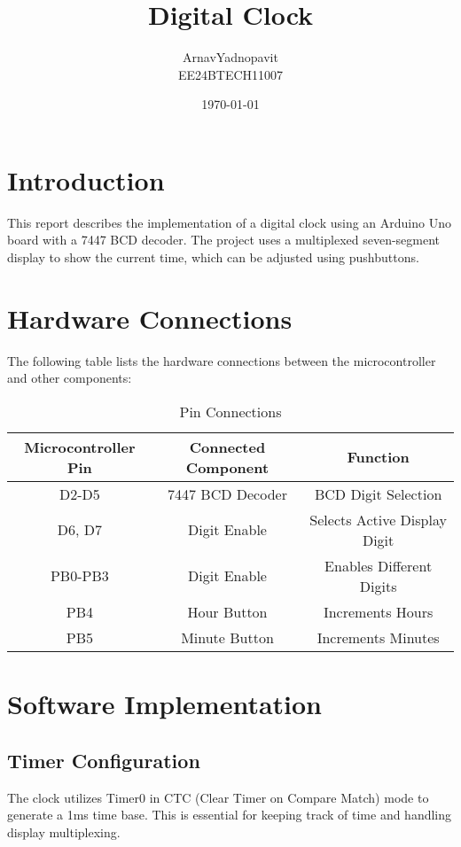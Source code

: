 \documentclass{article}
\title{Digital Clock}
\author{ArnavYadnopavit\\EE24BTECH11007}
\date{\today}
\begin{document}
\maketitle

\section{Introduction}
This report describes the implementation of a digital clock using an Arduino Uno board with a 7447 BCD decoder. The project uses a multiplexed seven-segment display to show the current time, which can be adjusted using pushbuttons.

\section{Hardware Connections}
The following table lists the hardware connections between the microcontroller and other components:

\begin{table}[h]
    \centering
    \begin{tabular}{|c|c|c|}
        \hline
        \textbf{Microcontroller Pin} & \textbf{Connected Component} & \textbf{Function} \\
        \hline
        D2-D5 & 7447 BCD Decoder & BCD Digit Selection \\
        D6, D7 & Digit Enable & Selects Active Display Digit \\
        PB0-PB3 & Digit Enable & Enables Different Digits \\
        PB4 & Hour Button & Increments Hours \\
        PB5 & Minute Button & Increments Minutes \\
        \hline
    \end{tabular}
    \caption{Pin Connections}
    \label{tab:connections}
\end{table}

\section{Software Implementation}

\subsection{Timer Configuration}
The clock utilizes Timer0 in CTC (Clear Timer on Compare Match) mode to generate a 1ms time base. This is essential for keeping track of time and handling display multiplexing.
\end{document}
